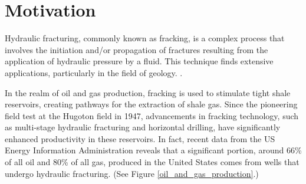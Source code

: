 \section{Motivation}

Hydraulic fracturing, commonly known as fracking, is a complex process that involves the initiation and/or propagation of fractures resulting from the application of hydraulic pressure by a fluid. This technique finds extensive applications, particularly in the field of geology. \cite{adachi2007computer}.

In the realm of oil and gas production, fracking is used to stimulate tight shale reservoirs, creating pathways for the extraction of shale gas. Since the pioneering field test at the Hugoton field in 1947, advancements in fracking technology, such as multi-stage hydraulic fracturing and horizontal drilling, have significantly enhanced productivity in these reservoirs. In fact, recent data from the US Energy Information Administration\cite{eia_data_on_gas, eia_data_on_oil} reveals that a significant portion, around 66\% of all oil and 80\% of all gas, produced in the United States comes from wells that undergo hydraulic fracturing. (See Figure \ref{oil_and_gas_production}.)

